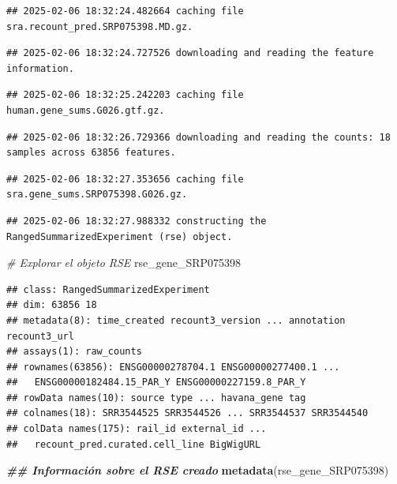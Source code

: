 \documentclass[
]{article}
\newenvironment{Shaded}{\begin{snugshade}}{\end{snugshade}}
\newcommand{\CommentTok}[1]{\textcolor[rgb]{0.56,0.35,0.01}{\textit{#1}}}
\newcommand{\DocumentationTok}[1]{\textcolor[rgb]{0.56,0.35,0.01}{\textbf{\textit{#1}}}}
\newcommand{\FunctionTok}[1]{\textcolor[rgb]{0.13,0.29,0.53}{\textbf{#1}}}
\newcommand{\NormalTok}[1]{#1}
\begin{document}
\begin{verbatim}
## 2025-02-06 18:32:24.482664 caching file sra.recount_pred.SRP075398.MD.gz.
\end{verbatim}

\begin{verbatim}
## 2025-02-06 18:32:24.727526 downloading and reading the feature information.
\end{verbatim}

\begin{verbatim}
## 2025-02-06 18:32:25.242203 caching file human.gene_sums.G026.gtf.gz.
\end{verbatim}

\begin{verbatim}
## 2025-02-06 18:32:26.729366 downloading and reading the counts: 18 samples across 63856 features.
\end{verbatim}

\begin{verbatim}
## 2025-02-06 18:32:27.353656 caching file sra.gene_sums.SRP075398.G026.gz.
\end{verbatim}

\begin{verbatim}
## 2025-02-06 18:32:27.988332 constructing the RangedSummarizedExperiment (rse) object.
\end{verbatim}

\begin{Shaded}
\begin{Highlighting}[]
\CommentTok{\# Explorar el objeto RSE}
\NormalTok{rse\_gene\_SRP075398}
\end{Highlighting}
\end{Shaded}

\begin{verbatim}
## class: RangedSummarizedExperiment 
## dim: 63856 18 
## metadata(8): time_created recount3_version ... annotation recount3_url
## assays(1): raw_counts
## rownames(63856): ENSG00000278704.1 ENSG00000277400.1 ...
##   ENSG00000182484.15_PAR_Y ENSG00000227159.8_PAR_Y
## rowData names(10): source type ... havana_gene tag
## colnames(18): SRR3544525 SRR3544526 ... SRR3544537 SRR3544540
## colData names(175): rail_id external_id ...
##   recount_pred.curated.cell_line BigWigURL
\end{verbatim}

\begin{Shaded}
\begin{Highlighting}[]
\DocumentationTok{\#\# Información sobre el RSE creado}
\FunctionTok{metadata}\NormalTok{(rse\_gene\_SRP075398)}
\end{Highlighting}
\end{Shaded}
\end{document}
